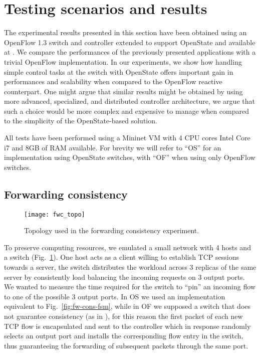\documentclass[10pt,conference]{IEEEtran}
\begin{document}
\section{Testing scenarios and results}
\label{sec:results}

The experimental results presented in this section have been obtained using an OpenFlow 1.3 switch and controller extended to support OpenState and available at \cite{openstatehomepage}. We compare the performances of the previously presented applications with a trivial OpenFlow implementation. In our experiments, we show how handling simple control tasks at the switch with OpenState offers important gain in performances and scalability when compared to the OpenFlow reactive counterpart. One might argue that similar results might be obtained by using more advanced, specialized, and distributed controller architecture, we argue that such a choice would be more complex and expensive to manage when compared to the simplicity of the OpenState-based solution.

All tests have been performed using a Mininet VM with 4 CPU cores Intel Core i7 and 8GB of RAM available. For brevity we will refer to ``OS'' for an implementation using OpenState switches, with ``OF'' when using only OpenFlow switches.

\subsection{Forwarding consistency}

\begin{figure}[b]
  \centering
  \texttt{[image: fwc\_topo]}
  \caption{Topology used in the forwarding consistency experiment.}
  \label{fig:fwc_topo}
\end{figure}

To preserve computing resources, we emulated a small network with 4 hosts and a switch (Fig.~\ref{fig:fwc_topo}). One host acts as a client willing to establish TCP sessions towards a server, the switch distributes the workload across 3 replicas of the same server by consistently load balancing the incoming requests on 3 output ports. We wanted to measure the time required for the switch to ``pin'' an incoming flow to one of the possible 3 output ports. In OS we used an implementation equivalent to Fig.~\ref{fig:fw-cons-fsm}, while in OF we supposed a switch that does not guarantee consistency (as in \cite{hp-of13-manual}), for this reason the first packet of each new TCP flow is encapsulated and sent to the controller which in response randomly selects an output port and installs the corresponding flow entry in the switch, thus guaranteeing the forwarding of subsequent packets through the same port.
\end{document}
